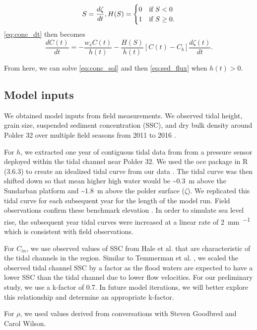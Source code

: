 \begin{equation}\label{eq:heaviside}
	S = \frac{d\zeta}{dt},\\
	H(S) =
	\begin{cases}
		0 & \text{if $S < 0$}\\
		1 & \text{if $S \geq 0$}.
	\end{cases}
\end{equation}
\autoref{eq:conc_dt} then becomes
\begin{equation}\label{eq:conc_sol}
	\frac{dC(t)}{dt} = - \frac{w_s C(t)}{h(t)} - \frac{H(S)}{h(t)} [C(t) - C_b]\frac{d\zeta(t)}{dt}.
\end{equation}

From here, we can solve \autoref{eq:conc_sol} and then \autoref{eq:sed_flux} when $h(t)>0$.

\subsection{Model inputs}

We obtained model inputs from field measurements. We observed tidal height, grain size, suspended sediment concentration (SSC), and dry bulk density around Polder 32 over multiple field seasons from 2011 to 2016 \citep{auerbachFloodRiskNatural2015,haleObservationsScalingTidal2019,haleSeasonalVariabilityForces2019}.

For $h$, we extracted one year of contiguous tidal data from from a pressure sensor deployed within the tidal channel near Polder 32. We used the oce package in R (3.6.3) to create an idealized tidal curve from our data \citep{kelleyOceAnalysisOceanographic2020}. The tidal curve was then shifted down so that mean higher high water would be \SI{~0.3}{\meter} above the Sundarban platform and \SI{~1.8}{\meter} above the polder surface ($\zeta$). We replicated this tidal curve for each subsequent year for the length of the model run. Field observations confirm these benchmark elevation \citep{auerbachFloodRiskNatural2015,haleSeasonalVariabilityForces2019,bomerSurfaceElevationSedimentation2020}. In order to simulate sea level rise, the subsequent year tidal curves were increased at a linear rate of \SI{2}{\milli\meter\per\year} which is consistent with field observations.


For $C_{in}$, we use observed values of SSC from Hale et al. \citep{haleObservationsScalingTidal2019} that are characteristic of the tidal channels in the region. Similar to Temmerman et al. \citep{temmermanModellingLongtermTidal2003,temmermanModellingEstuarineVariations2004}, we scaled the observed tidal channel SSC by a factor as the flood waters are expected to have a lower SSC than the tidal channel due to lower flow velocities. For our preliminary study, we use a k-factor of 0.7. In future model iterations, we will better explore this relationship and determine an appropriate k-factor.

For $\rho$, we used values derived from conversations with Steven Goodbred and Carol Wilson.